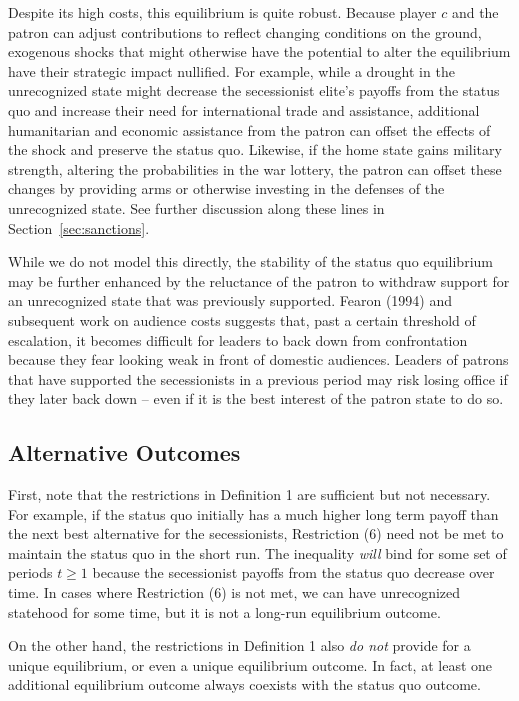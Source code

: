 \documentclass[11pt,letterpaper, notitlepage]{article}
\begin{document}
Despite its high costs, this equilibrium is quite robust. Because player $c$ and the patron can adjust contributions to reflect changing conditions on the ground, exogenous shocks that might otherwise have the potential to alter the equilibrium have their strategic impact nullified. For example, while a drought in the unrecognized state might decrease the secessionist elite's payoffs from the status quo and increase their need for international trade and assistance, additional humanitarian and economic assistance from the patron can offset the effects of the shock and preserve the status quo. Likewise, if the home state gains military strength, altering the probabilities in the war lottery, the patron can offset these changes by providing arms or otherwise investing in the defenses of the unrecognized state. See further discussion along these lines in Section~\ref{sec:sanctions}.

While we do not model this directly, the stability of the status quo equilibrium may be further enhanced by the reluctance of the patron to withdraw support for an unrecognized state that was previously supported. Fearon (1994) and subsequent work on audience costs suggests that, past a certain threshold of escalation, it becomes difficult for leaders to back down from confrontation because they fear looking weak in front of domestic audiences. Leaders of patrons that have supported the secessionists in a previous period may risk losing office if they later back down -- even if it is the best interest of the patron state to do so.  

\subsection{Alternative Outcomes}
\label{sec:alt}

First, note that the restrictions in Definition 1 are sufficient but not necessary. For example, if the status quo initially has a much higher long term payoff than the next best alternative for the secessionists, Restriction (6) need not be met to maintain the status quo in the short run. The inequality \emph{will} bind for some set of periods $t \geq 1$ because the secessionist payoffs from the status quo decrease over time. In cases where Restriction (6) is not met, we can have unrecognized statehood for some time, but it is not a long-run equilibrium outcome.

On the other hand, the restrictions in Definition 1 also \emph{do not} provide for a unique equilibrium, or even a unique equilibrium outcome. In fact, at least one additional equilibrium outcome always coexists with the status quo outcome.
\end{document}

